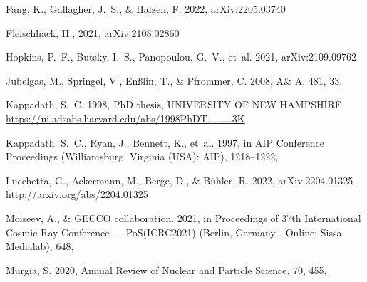 \begin{thebibliography}{99}
Fang, K., Gallagher, J.~S., \& Halzen, F. 2022, arXiv:2205.03740

Fleischhack, H., 2021, 
arXiv.2108.02860



Hopkins, P.~F., Butsky, I.~S., Panopoulou, G.~V., {et~al.} 2021,
  arXiv:2109.09762

Jubelgas, M., Springel, V., Enßlin, T., \& Pfrommer, C. 2008, A\& A, 481, 33, 

Kappadath, S.~C. 1998, PhD thesis, UNIVERSITY OF NEW HAMPSHIRE.
\newblock \url{https://ui.adsabs.harvard.edu/abs/1998PhDT.........3K}

Kappadath, S.~C., Ryan, J., Bennett, K., {et~al.} 1997, in {AIP} {Conference}
  {Proceedings} (Williamsburg, Virginia (USA): AIP), 1218--1222,

Lucchetta, G., Ackermann, M., Berge, D., \& Bühler, R. 2022, arXiv:2204.01325
  .
\newblock \url{http://arxiv.org/abs/2204.01325}

Moiseev, A., \& {GECCO collaboration}. 2021, in Proceedings of 37th
  {International} {Cosmic} {Ray} {Conference} — {PoS}({ICRC2021}) (Berlin,
  Germany - Online: Sissa Medialab), 648, 

Murgia, S. 2020, Annual Review of Nuclear and Particle Science, 70, 455,
\fi 


\end{thebibliography}
